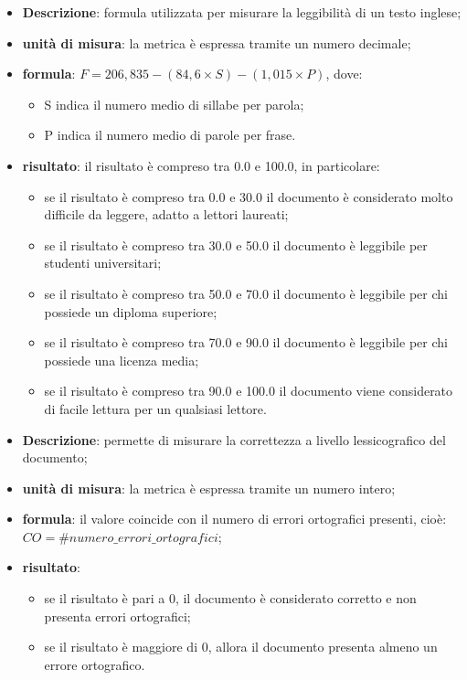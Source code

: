 		\begin{itemize}
			\item{\textbf{Descrizione}}: formula utilizzata per misurare la leggibilità di un testo inglese;
			\item{\textbf{unità di misura}}: la metrica è espressa tramite un numero decimale;
			\item{\textbf{formula}}: $ F = 206,835 - (84,6 \times S) - (1,015 \times P) $, dove:
				\begin{itemize}
					\item S indica il numero medio di sillabe per parola;
					\item P indica il numero medio di parole per frase.
				\end{itemize}
			\item{\textbf{risultato}}: il risultato è compreso tra 0.0 e 100.0, in particolare:
				\begin{itemize}
					\item se il risultato è compreso tra 0.0 e 30.0 il documento è considerato molto difficile da leggere, adatto a lettori laureati;
					\item se il risultato è compreso tra 30.0 e 50.0 il documento è leggibile per studenti universitari;
					\item se il risultato è compreso tra 50.0 e 70.0 il documento è leggibile per chi possiede un diploma superiore;
					\item se il risultato è compreso tra 70.0 e 90.0 il documento è leggibile per chi possiede una licenza media;
					\item se il risultato è compreso tra 90.0 e 100.0 il documento viene considerato di facile lettura per un qualsiasi lettore.
				\end{itemize}
		\end{itemize}

		\begin{itemize}
			\item{\textbf{Descrizione}}: permette di misurare la correttezza a livello lessicografico del documento;
			\item{\textbf{unità di misura}}: la metrica è espressa tramite un numero intero;
			\item{\textbf{formula}}: il valore coincide con il numero di errori ortografici presenti, cioè: $ CO = \#numero\_errori\_ortografici $;
			\item{\textbf{risultato}}:
				\begin{itemize}
					\item se il risultato è pari a 0, il documento è considerato corretto e non presenta errori ortografici;
					\item se il risultato è maggiore di 0, allora il documento presenta almeno un errore ortografico.
				\end{itemize}
		\end{itemize}

